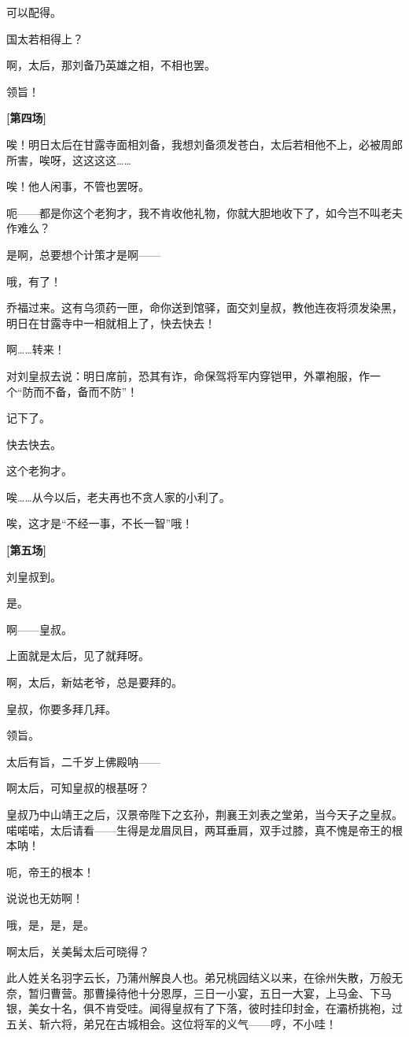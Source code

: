可以配得。

国太若相得上？

啊，太后，那刘备乃英雄之相，不相也罢。

领旨！

\textbf{{[}第四场{]}}

唉！明日太后在甘露寺面相刘备，我想刘备须发苍白，太后若相他不上，必被周郎所害，唉呀，这这这这\ldots{}\ldots{}

唉！他人闲事，不管也罢呀。

呃------都是你这个老狗才，我不肯收他礼物，你就大胆地收下了，如今岂不叫老夫作难么？

是啊，总要想个计策才是啊------

哦，有了！

乔福过来。这有乌须药一匣，命你送到馆驿，面交刘皇叔，教他连夜将须发染黑，明日在甘露寺中一相就相上了，快去快去！

啊\ldots{}\ldots{}转来！

对刘皇叔去说：明日席前，恐其有诈，命保驾将军内穿铠甲，外罩袍服，作一个``防而不备，备而不防''！

记下了。

快去快去。

这个老狗才。

唉\ldots{}\ldots{}从今以后，老夫再也不贪人家的小利了。

唉，这才是``不经一事，不长一智''哦！

\textbf{{[}第五场{]}}

刘皇叔到。

是。

啊------皇叔。

上面就是太后，见了就拜呀。

啊，太后，新姑老爷，总是要拜的。

皇叔，你要多拜几拜。

领旨。

太后有旨，二千岁上佛殿呐------

啊太后，可知皇叔的根基呀？

皇叔乃中山靖王之后，汉景帝陛下之玄孙，荆襄王刘表之堂弟，当今天子之皇叔。喏喏喏，太后请看------生得是龙眉凤目，两耳垂肩，双手过膝，真不愧是帝王的根本呐！

呃，帝王的根本！

说说也无妨啊！

哦，是，是，是。

啊太后，关美髯太后可晓得？

此人姓关名羽字云长，乃蒲州解良人也。弟兄桃园结义以来，在徐州失散，万般无奈，暂归曹营。那曹操待他十分恩厚，三日一小宴，五日一大宴，上马金、下马银，美女十名，俱不肯受哇。闻得皇叔有了下落，彼时挂印封金，在灞桥挑袍，过五关、斩六将，弟兄在古城相会。这位将军的义气------哼，不小哇！

